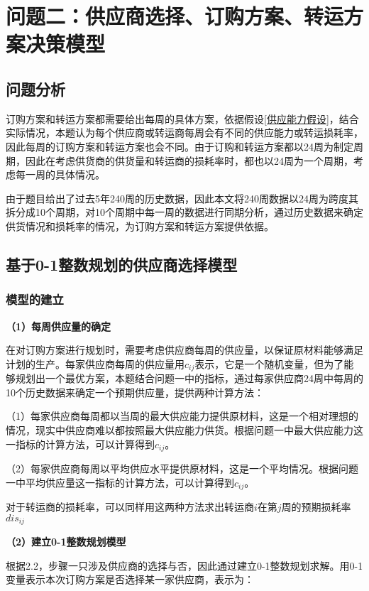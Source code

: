 \documentclass[withoutpreface,bwprint]{cumcmthesis} %
\begin{document}
\section{问题二：供应商选择、订购方案、转运方案决策模型}
\subsection{问题分析}
订购方案和转运方案都需要给出每周的具体方案，依据假设\ref{供应能力假设}，结合实际情况，本题认为每个供应商或转运商每周会有不同的供应能力或转运损耗率，因此每周的订购方案和转运方案也会不同。由于订购和转运方案都以24周为制定周期，因此在考虑供货商的供货量和转运商的损耗率时，都也以24周为一个周期，考虑每一周的具体情况。

由于题目给出了过去5年240周的历史数据，因此本文将240周数据以24周为跨度其拆分成10个周期，对10个周期中每一周的数据进行同期分析，通过历史数据来确定供货情况和损耗率的情况，为订购方案和转运方案提供依据。

\subsection{基于0-1整数规划的供应商选择模型}
\subsubsection{模型的建立}
\label{供应量的确定}

\noindent\textbf{（1）每周供应量的确定}

在对订购方案进行规划时，需要考虑供应商每周的供应量，以保证原材料能够满足计划的生产。每家供应商每周的供应量用$c_{i j}$表示，它是一个随机变量，但为了能够规划出一个最优方案，本题结合问题一中的指标，通过每家供应商24周中每周的10个历史数据来确定一个预期供应量，提供两种计算方法：

（1）每家供应商每周都以当周的最大供应能力提供原材料，这是一个相对理想的情况，现实中供应商难以都按照最大供应能力供货。根据问题一中最大供应能力这一指标的计算方法，可以计算得到$c_{i j}$。

（2）每家供应商每周以平均供应水平提供原材料，这是一个平均情况。根据问题一中平均供应量这一指标的计算方法，可以计算得到$c_{i j}$。

对于转运商的损耗率，可以同样用这两种方法求出转运商$i$在第$j$周的预期损耗率$dis_{ij}$

\noindent\textbf{（2）建立0-1整数规划模型}

根据2.2，步骤一只涉及供应商的选择与否，因此通过建立0-1整数规划求解。用0-1变量表示本次订购方案是否选择某一家供应商，表示为：
\end{document}
